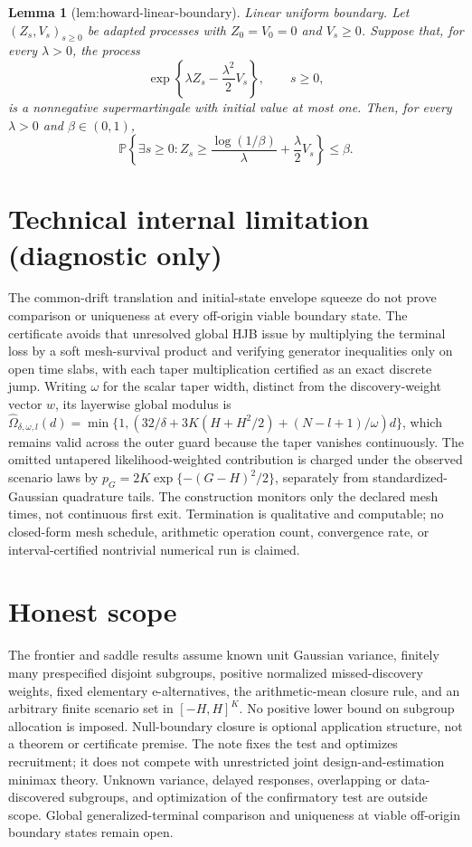 \documentclass{article}
\newtheorem{lemma}{Lemma}
\begin{document}
\begin{lemma}[lem:howard-linear-boundary]\label{lem:howard-linear-boundary}
Linear uniform boundary.  Let \((Z_s,V_s)_{s\geq 0}\) be adapted processes with \(Z_0=V_0=0\) and \(V_s\geq 0\).  Suppose that, for every \(\lambda>0\), the process
\[
\exp\!\left\{\lambda Z_s-\frac{\lambda^2}{2}V_s\right\},\qquad s\geq 0,
\]
is a nonnegative supermartingale with initial value at most one.  Then, for every \(\lambda>0\) and \(\beta\in(0,1)\),
\[
\mathbb P\!\left\{\exists s\geq 0:
Z_s\geq \frac{\log(1/\beta)}{\lambda}+\frac{\lambda}{2}V_s\right\}\leq\beta.
\]
\end{lemma}

\section*{Technical internal limitation (diagnostic only)}

The common-drift translation and initial-state envelope squeeze do not prove comparison or uniqueness at every off-origin viable boundary state. The certificate avoids that unresolved global HJB issue by multiplying the terminal loss by a soft mesh-survival product and verifying generator inequalities only on open time slabs, with each taper multiplication certified as an exact discrete jump. Writing \(\omega\) for the scalar taper width, distinct from the discovery-weight vector \(w\), its layerwise global modulus is \(\widehat\Omega_{\delta,\omega,l}(d)=\min\{1,(32/\delta+3K(H+H^2/2)+(N-l+1)/\omega)d\}\), which remains valid across the outer guard because the taper vanishes continuously. The omitted untapered likelihood-weighted contribution is charged under the observed scenario laws by \(p_G=2K\exp\{-(G-H)^2/2\}\), separately from standardized-Gaussian quadrature tails. The construction monitors only the declared mesh times, not continuous first exit. Termination is qualitative and computable; no closed-form mesh schedule, arithmetic operation count, convergence rate, or interval-certified nontrivial numerical run is claimed.

\section{Honest scope}

The frontier and saddle results assume known unit Gaussian variance, finitely many prespecified disjoint subgroups, positive normalized missed-discovery weights, fixed elementary e-alternatives, the arithmetic-mean closure rule, and an arbitrary finite scenario set in \([-H,H]^K\). No positive lower bound on subgroup allocation is imposed. Null-boundary closure is optional application structure, not a theorem or certificate premise. The note fixes the test and optimizes recruitment; it does not compete with unrestricted joint design-and-estimation minimax theory. Unknown variance, delayed responses, overlapping or data-discovered subgroups, and optimization of the confirmatory test are outside scope. Global generalized-terminal comparison and uniqueness at viable off-origin boundary states remain open.
\end{document}
